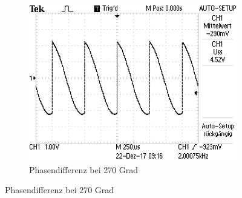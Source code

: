 \begin{figure}[H]
\begin{subfigure}{0.48\textwidth}
	\includegraphics[width=\textwidth]{270Grad.JPG}
  \caption{Phasendifferenz bei 270 Grad}
\end{subfigure}
\end{figure}

